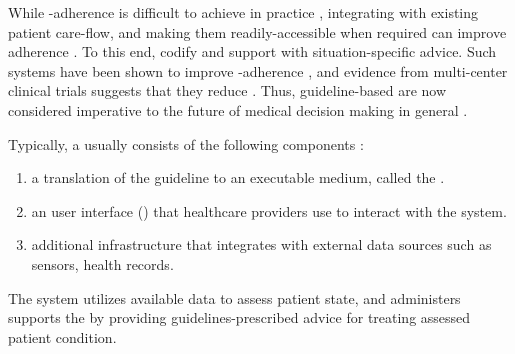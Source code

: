 While \BPG{}-adherence is difficult to achieve in
practice \cite{RandJAMA99,DavisCMAJ97},
integrating \BPGs{} with existing patient care-flow,
and making them readily-accessible when required can improve adherence \cite{WoolfBMJ99}.
To this end, \CDSSs{}
codify \BPGs{} and support \HCPs{} with situation-specific advice.
Such systems have been shown to improve \BPG{}-adherence \cite{GargJAMA06,KawamotoBMJ05}, and evidence from multi-center clinical trials
suggests that they reduce \PMEs{} \cite{BenettJAMIA16,SahotaJIS11}.
Thus, guideline-based \CDSSs{} are now considered imperative to the
future of medical decision making in general \cite{JamesNEJM01}.

Typically, a \CDSS{} usually consists of the following components \cite{SuttonNature20}:
\begin{enumerate}[label=(\alph*)]
  \item a translation of the guideline to an executable medium, called the
  \BPGLogic{}.
\item an user interface (\UI{}) that healthcare providers use to interact with
  the system.
  \item additional infrastructure that integrates with external data sources
  such as sensors, health records.
\end{enumerate}
The system utilizes available data to assess patient state, and administers
supports the \HCP{} by providing guidelines-prescribed advice for treating
assessed patient condition.




